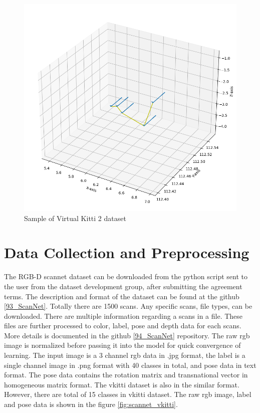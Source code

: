 	\begin{figure}[h]
		\centering
		\includegraphics[width=14cm]{images/pose_viz_vkitti.png}
		\caption{Sample of Virtual Kitti 2 dataset}
		\label{fig:sample_pose_scannet_vkitti_2}
	\end{figure}
	
	\section{Data Collection and Preprocessing}
	
	The RGB-D scannet dataset can be downloaded from the python script sent to the user from the dataset development group, after submitting the agreement terms. The description and format of the dataset can be found at the github \ref{93_ScanNet}. Totally there are 1500 scans. Any specific scans, file types,  can be downloaded. There are multiple information regarding a scans in a file. These files are further processed to color, label, pose and depth data for each scans. More details is documented in the github \ref{94_ScanNet} repository. The raw rgb image is normalized before passing it into the model for quick convergence of learning. The input image is a 3 channel rgb data in .jpg format, the label is a single channel image in .png format with 40 classes in total, and pose data in text format. The pose data contains the rotation matrix and transnational vector in homogeneous matrix format. The vkitti dataset is also in the similar format. However, there are total of 15 classes in vkitti dataset. The raw rgb image, label and pose data is shown in the figure \ref{fig:scannet_vkitti}.

